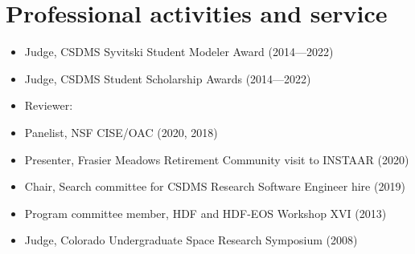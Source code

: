 \section{Professional activities and service}
\vspace{0.5em}

\begin{itemize}

  \item Judge, CSDMS Syvitski Student Modeler Award (2014---2022)

  \item Judge, CSDMS Student Scholarship Awards (2014---2022)

  \item Reviewer:

  \item Panelist, NSF CISE/OAC (2020, 2018)

  \item Presenter, Frasier Meadows Retirement Community visit to INSTAAR (2020)

  \item Chair, Search committee for CSDMS Research Software Engineer hire (2019)

  \item Program committee member, HDF and HDF-EOS Workshop XVI (2013)

  \item Judge, Colorado Undergraduate Space Research Symposium (2008)

\end{itemize}
